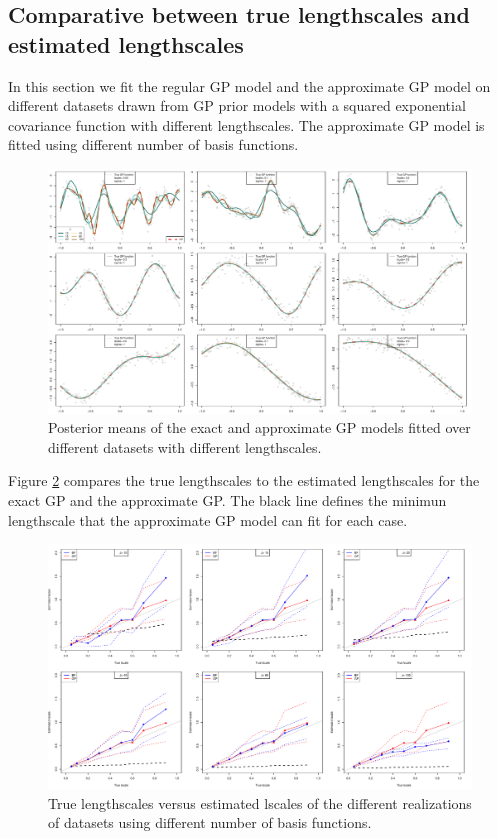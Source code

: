 \documentclass[]{interact}
\theoremstyle{plain}%
\theoremstyle{definition}
\theoremstyle{remark}
\begin{document}
\subsection{Comparative between true lengthscales and estimated lengthscales}

In this section we fit the regular GP model and the approximate GP model on different datasets drawn from GP prior models with a squared exponential covariance function with different lengthscales. The approximate GP model is fitted using different number of basis functions.

\begin{figure}[H]
\centering
\includegraphics[scale=0.4]{fig7_varing_lscale.pdf}
\caption{Posterior means of the exact and approximate GP models fitted over different datasets with different lengthscales.}
  \label{fig7_varing_lscale}
\end{figure}

Figure \ref{fig8_Tlscale_vs_Elscale} compares the true lengthscales to the estimated lengthscales for the exact GP and the approximate GP. The black line defines the minimun lengthscale that the approximate GP model can fit for each case.

\begin{figure}[H]
\centering
\includegraphics[scale=0.4]{fig8_Tlscale_vs_Elscale.pdf}
\caption{True lengthscales versus estimated lscales of the different realizations of datasets using different number of basis functions. }
  \label{fig8_Tlscale_vs_Elscale}
\end{figure}
\end{document}
